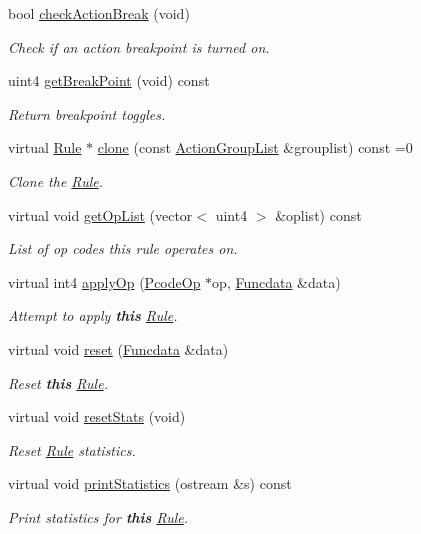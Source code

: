 \begin{DoxyCompactItemize}
bool \mbox{\hyperlink{class_rule_a8bfe310fc05ec8dfb8d46953158d76f2}{check\+Action\+Break}} (void)
\begin{DoxyCompactList}\small\item\em Check if an action breakpoint is turned on. \end{DoxyCompactList}\item 
uint4 \mbox{\hyperlink{class_rule_ab3051cfc2bf2286c91023a9f647c86b9}{get\+Break\+Point}} (void) const
\begin{DoxyCompactList}\small\item\em Return breakpoint toggles. \end{DoxyCompactList}\item 
virtual \mbox{\hyperlink{class_rule}{Rule}} $\ast$ \mbox{\hyperlink{class_rule_a70de90a76461bfa7ea0b575ce3c11e4d}{clone}} (const \mbox{\hyperlink{class_action_group_list}{Action\+Group\+List}} \&grouplist) const =0
\begin{DoxyCompactList}\small\item\em Clone the \mbox{\hyperlink{class_rule}{Rule}}. \end{DoxyCompactList}\item 
virtual void \mbox{\hyperlink{class_rule_a4023bfc7825de0ab866790551856d10e}{get\+Op\+List}} (vector$<$ uint4 $>$ \&oplist) const
\begin{DoxyCompactList}\small\item\em List of op codes this rule operates on. \end{DoxyCompactList}\item 
virtual int4 \mbox{\hyperlink{class_rule_a4e3e61f066670175009f60fb9dc60848}{apply\+Op}} (\mbox{\hyperlink{class_pcode_op}{Pcode\+Op}} $\ast$op, \mbox{\hyperlink{class_funcdata}{Funcdata}} \&data)
\begin{DoxyCompactList}\small\item\em Attempt to apply {\bfseries{this}} \mbox{\hyperlink{class_rule}{Rule}}. \end{DoxyCompactList}\item 
virtual void \mbox{\hyperlink{class_rule_a1f074d593a6fefc79a5c07e4b3e13674}{reset}} (\mbox{\hyperlink{class_funcdata}{Funcdata}} \&data)
\begin{DoxyCompactList}\small\item\em Reset {\bfseries{this}} \mbox{\hyperlink{class_rule}{Rule}}. \end{DoxyCompactList}\item 
virtual void \mbox{\hyperlink{class_rule_adc634cc8f189a6641aac6e24e2473103}{reset\+Stats}} (void)
\begin{DoxyCompactList}\small\item\em Reset \mbox{\hyperlink{class_rule}{Rule}} statistics. \end{DoxyCompactList}\item 
virtual void \mbox{\hyperlink{class_rule_a80e0ad50a132df1b33b7705ccdea01b3}{print\+Statistics}} (ostream \&s) const
\begin{DoxyCompactList}\small\item\em Print statistics for {\bfseries{this}} \mbox{\hyperlink{class_rule}{Rule}}. \end{DoxyCompactList}\end{DoxyCompactItemize}
